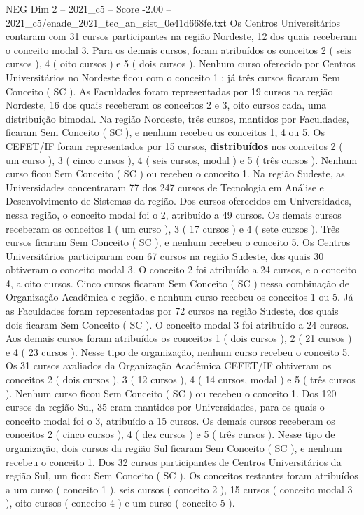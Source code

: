 \begin{textsample}{NEG Dim 2 – 2021\_c5 – Score -2.00 – 2021\_c5/enade\_2021\_tec\_an\_sist\_0e41d668fe.txt}
Os Centros Universitários contaram com 31 cursos participantes na região Nordeste, 12 dos quais receberam o conceito modal 3.
Para os demais cursos, foram atribuídos os conceitos 2 ( seis cursos ), 4 ( oito cursos ) e 5 ( dois cursos ).
Nenhum curso oferecido por Centros Universitários no Nordeste ficou com o conceito 1 ; já três cursos ficaram Sem Conceito ( SC ).
As Faculdades foram representadas por 19 cursos na região Nordeste, 16 dos quais receberam os conceitos 2 e 3, oito cursos cada, uma distribuição bimodal.
Na região Nordeste, três cursos, mantidos por Faculdades, ficaram Sem Conceito ( SC ), e nenhum recebeu os conceitos 1, 4 ou 5.
Os CEFET/IF foram representados por 15 cursos, \textbf{distribuídos} nos conceitos 2 ( um curso ), 3 ( cinco cursos ), 4 ( seis cursos, modal ) e 5 ( três cursos ).
Nenhum curso ficou Sem Conceito ( SC ) ou recebeu o conceito 1.
Na região Sudeste, as Universidades concentraram 77 dos 247 cursos de Tecnologia em Análise e Desenvolvimento de Sistemas da região.
Dos cursos oferecidos em Universidades, nessa região, o conceito modal foi o 2, atribuído a 49 cursos.
Os demais cursos receberam os conceitos 1 ( um curso ), 3 ( 17 cursos ) e 4 ( sete cursos ).
Três cursos ficaram Sem Conceito ( SC ), e nenhum recebeu o conceito 5.
Os Centros Universitários participaram com 67 cursos na região Sudeste, dos quais 30 obtiveram o conceito modal 3.
O conceito 2 foi atribuído a 24 cursos, e o conceito 4, a oito cursos.
Cinco cursos ficaram Sem Conceito ( SC ) nessa combinação de Organização Acadêmica e região, e nenhum curso recebeu os conceitos 1 ou 5.
Já as Faculdades foram representadas por 72 cursos na região Sudeste, dos quais dois ficaram Sem Conceito ( SC ).
O conceito modal 3 foi atribuído a 24 cursos.
Aos demais cursos foram atribuídos os conceitos 1 ( dois cursos ), 2 ( 21 cursos ) e 4 ( 23 cursos ).
Nesse tipo de organização, nenhum curso recebeu o conceito 5.
Os 31 cursos avaliados da Organização Acadêmica CEFET/IF obtiveram os conceitos 2 ( dois cursos ), 3 ( 12 cursos ), 4 ( 14 cursos, modal ) e 5 ( três cursos ).
Nenhum curso ficou Sem Conceito ( SC ) ou recebeu o conceito 1.
Dos 120 cursos da região Sul, 35 eram mantidos por Universidades, para os quais o conceito modal foi o 3, atribuído a 15 cursos.
Os demais cursos receberam os conceitos 2 ( cinco cursos ), 4 ( dez cursos ) e 5 ( três cursos ).
Nesse tipo de organização, dois cursos da região Sul ficaram Sem Conceito ( SC ), e nenhum recebeu o conceito 1.
Dos 32 cursos participantes de Centros Universitários da região Sul, um ficou Sem Conceito ( SC ).
Os conceitos restantes foram atribuídos a um curso ( conceito 1 ), seis cursos ( conceito 2 ), 15 cursos ( conceito modal 3 ), oito cursos ( conceito 4 ) e um curso ( conceito 5 ).

\end{textsample}
